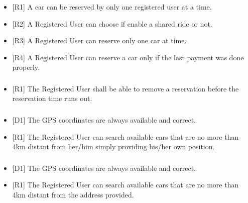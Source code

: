 \subsubsection{\gRegisteredReserve}
\begin{itemize}
	\item {[}R1{]} A car can be reserved by only one registered user at a time.
	\item {[}R2{]} A Registered User can choose if enable a shared ride or not.
	\item {[}R3{]} A Registered User can reserve only one car at time.
	\item {[}R4{]} A Registered User can reserve a car only if the last payment was done properly.
\end{itemize}
\subsubsection{\gRegisteredDeleteReservation}
\begin{itemize}
	\item {[}R1{]} The Registered User shall be able to remove a reservation before the reservation time runs out.
\end{itemize}
\subsubsection{\gRegisteredSearchDistance}
\begin{itemize}
	\item {[}D1{]} The GPS coordinates are always available and correct.
	\item {[}R1{]} The Registered User can search available cars that are no more than 4km distant from her/him simply providing his/her own position.
\end{itemize}
\subsubsection{\gRegisteredSearchAddress}
\begin{itemize}
	\item {[}D1{]} The GPS coordinates are always available and correct.
	\item {[}R1{]} The Registered User can search available cars that are no more than 4km distant from the address provided.
\end{itemize}
